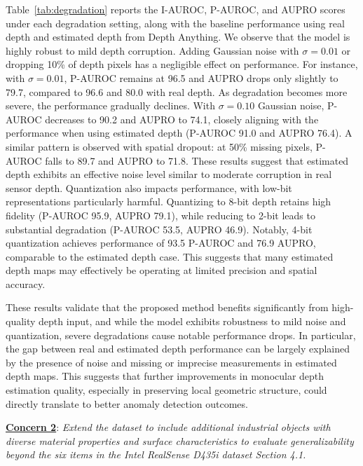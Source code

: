 \documentclass[a4paper,fleqnn]{cas-sc}
\begin{document}
Table~\ref{tab:degradation} reports the I-AUROC, P-AUROC, and AUPRO scores under each degradation setting, along with the baseline performance using real depth and estimated depth from Depth Anything. We observe that the model is highly robust to mild depth corruption. Adding Gaussian noise with $\sigma = 0.01$ or dropping 10\% of depth pixels has a negligible effect on performance. For instance, with $\sigma = 0.01$, P-AUROC remains at 96.5 and AUPRO drops only slightly to 79.7, compared to 96.6 and 80.0 with real depth. As degradation becomes more severe, the performance gradually declines. With $\sigma = 0.10$ Gaussian noise, P-AUROC decreases to 90.2 and AUPRO to 74.1, closely aligning with the performance when using estimated depth (P-AUROC 91.0 and AUPRO 76.4). A similar pattern is observed with spatial dropout: at 50\% missing pixels, P-AUROC falls to 89.7 and AUPRO to 71.8. These results suggest that estimated depth exhibits an effective noise level similar to moderate corruption in real sensor depth. Quantization also impacts performance, with low-bit representations particularly harmful. Quantizing to 8-bit depth retains high fidelity (P-AUROC 95.9, AUPRO 79.1), while reducing to 2-bit leads to substantial degradation (P-AUROC 53.5, AUPRO 46.9). Notably, 4-bit quantization achieves performance of 93.5 P-AUROC and 76.9 AUPRO, comparable to the estimated depth case. This suggests that many estimated depth maps may effectively be operating at limited precision and spatial accuracy.

These results validate that the proposed method benefits significantly from high-quality depth input, and while the model exhibits robustness to mild noise and quantization, severe degradations cause notable performance drops. In particular, the gap between real and estimated depth performance can be largely explained by the presence of noise and missing or imprecise measurements in estimated depth maps. This suggests that further improvements in monocular depth estimation quality, especially in preserving local geometric structure, could directly translate to better anomaly detection outcomes.



\vspace{1em}

\noindent \textbf{\underline{Concern 2}}: \textit{Extend the dataset to include additional industrial objects with diverse material properties and surface characteristics to evaluate generalizability beyond the six items in the Intel RealSense D435i dataset Section 4.1. \\}
\end{document}

